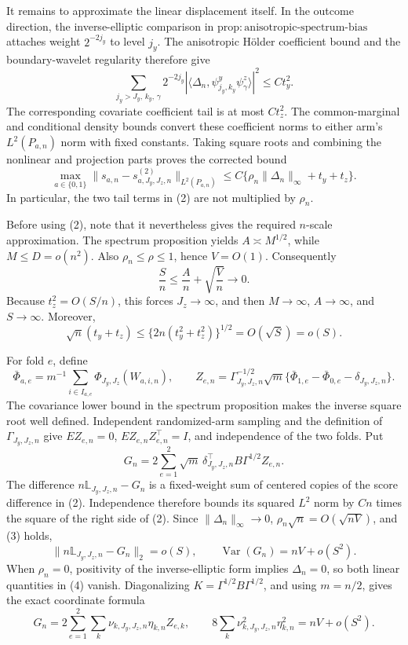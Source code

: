 It remains to approximate the linear displacement itself.  In the outcome direction, the inverse-elliptic comparison in \(\mathrm{prop{:}anisotropic\mbox{-}spectrum\mbox{-}bias}\) attaches weight \(2^{-2j_y}\) to level \(j_y\).  The anisotropic H\"older coefficient bound and the boundary-wavelet regularity therefore give
\[
\sum_{j_y>J_y,\,k_y,\,\gamma}2^{-2j_y}|\langle\Delta_n,
\psi^y_{j_y,k_y}\psi^z_\gamma\rangle|^2\le C t_y^2.
\]
The corresponding covariate coefficient tail is at most \(Ct_z^2\).  The common-marginal and conditional density bounds convert these coefficient norms to either arm's \(L^2(P_{a,n})\) norm with fixed constants.  Taking square roots and combining the nonlinear and projection parts proves the corrected bound
\[
\boxed{\quad
\max_{a\in\{0,1\}}\|s_{a,n}-s^{(2)}_{a,J_y,J_z,n}\|_{L^2(P_{a,n})}
\le C\{\rho_n\|\Delta_n\|_\infty+t_y+t_z\}.
\quad}                                                                  \tag{2}
\]
In particular, the two tail terms in (2) are not multiplied by \(\rho_n\).

Before using (2), note that it nevertheless gives the required \(n\)-scale approximation.  The spectrum proposition yields \(A\asymp M^{1/2}\), while \(M\le D=o(n^2)\).  Also \(\rho_n\le\rho\le1\), hence \(V=O(1)\).  Consequently
\[
\frac Sn\le \frac An+\sqrt{\frac Vn}\longrightarrow0.
\]
Because \(t_z^2=O(S/n)\), this forces \(J_z\to\infty\), and then \(M\to\infty\), \(A\to\infty\), and \(S\to\infty\).  Moreover,
\[
\sqrt n(t_y+t_z)\le\{2n(t_y^2+t_z^2)\}^{1/2}=O(\sqrt S)=o(S).           \tag{3}
\]

For fold \(e\), define
\[
\bar\Phi_{a,e}=m^{-1}\sum_{i\in I_{a,e}}\Phi_{J_y,J_z}(W_{a,i,n}),
\qquad
Z_{e,n}=\Gamma_{J_y,J_z,n}^{-1/2}\sqrt m
\{\bar\Phi_{1,e}-\bar\Phi_{0,e}-\delta_{J_y,J_z,n}\}.
\]
The covariance lower bound in the spectrum proposition makes the inverse square root well defined.  Independent randomized-arm sampling and the definition of \(\Gamma_{J_y,J_z,n}\) give \(EZ_{e,n}=0\), \(E Z_{e,n}Z_{e,n}^{\top}=I\), and independence of the two folds.  Put
\[
G_n=2\sum_{e=1}^2\sqrt m\,\delta_{J_y,J_z,n}^{\top}
B\Gamma^{1/2}Z_{e,n}.
\]
The difference \(n\mathbb L_{J_y,J_z,n}-G_n\) is a fixed-weight sum of centered copies of the score difference in (2).  Independence therefore bounds its squared \(L^2\) norm by \(Cn\) times the square of the right side of (2).  Since \(\|\Delta_n\|_\infty\to0\), \(\rho_n\sqrt n=O(\sqrt{nV})\), and (3) holds,
\[
\|n\mathbb L_{J_y,J_z,n}-G_n\|_2=o(S),
\qquad
\operatorname{Var}(G_n)=nV+o(S^2).                                    \tag{4}
\]
When \(\rho_n=0\), positivity of the inverse-elliptic form implies \(\Delta_n=0\), so both linear quantities in (4) vanish.  Diagonalizing \(K=\Gamma^{1/2}B\Gamma^{1/2}\), and using \(m=n/2\), gives the exact coordinate formula
\[
G_n=2\sum_{e=1}^2\sum_k\nu_{k,J_y,J_z,n}\eta_{k,n}Z_{e,k},
\qquad
8\sum_k\nu_{k,J_y,J_z,n}^2\eta_{k,n}^2=nV+o(S^2).                    \tag{5}
\]

